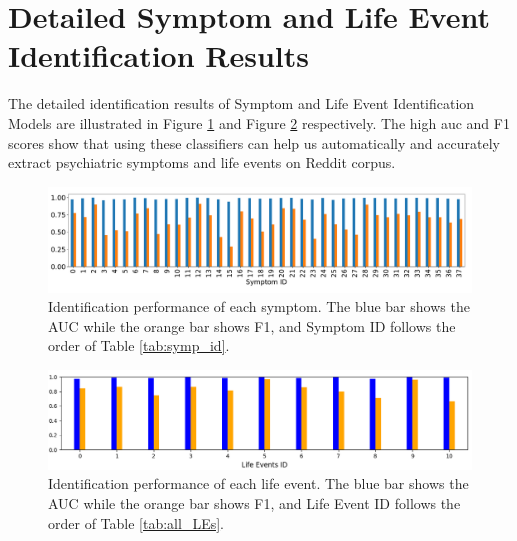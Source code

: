 \section{Detailed Symptom and Life Event Identification Results}
\label{sec:symp_ident_res}
The detailed identification results of Symptom and Life Event Identification Models are illustrated in Figure \ref{fig:symptoms_auc_f1} and Figure \ref{fig:LEs_auc_f1} respectively. The high auc and F1 scores show that using these classifiers can help us automatically and accurately extract psychiatric symptoms and life events on Reddit corpus. 
\begin{figure}[th]
	\centering
	\includegraphics[width=\linewidth]{figures/Symptom_AUC_F1_Multi_disease.pdf}
	\caption{Identification performance of each symptom. The blue bar shows the AUC while the orange bar shows F1, and Symptom ID follows the order of Table \ref{tab:symp_id}. }
	\label{fig:symptoms_auc_f1}
\end{figure}

\begin{figure}[th]
	\centering
	\includegraphics[width=\linewidth]{figures/LEs_auc_f1.png}
	\caption{Identification performance of each life event. The blue bar shows the AUC while the orange bar shows F1, and Life Event ID follows the order of Table \ref{tab:all_LEs}. }
	\label{fig:LEs_auc_f1}
\end{figure}

